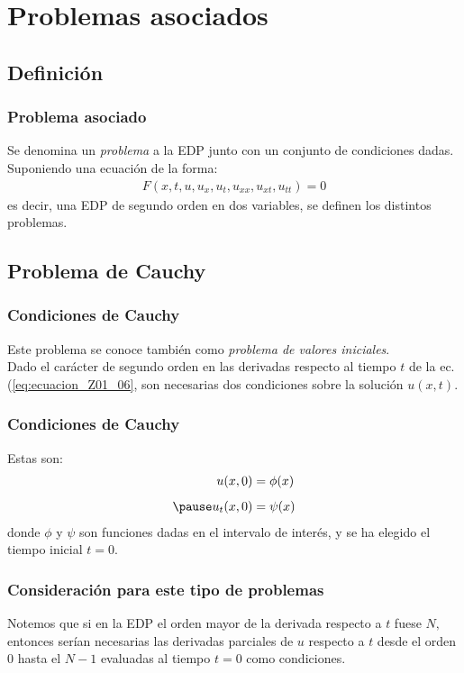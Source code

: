 \documentclass[12pt]{beamer}
\begin{document}

\section{Problemas asociados}
\subsection{Definición}

\begin{frame}
\frametitle{Problema asociado}
Se denomina un \emph{problema} a la EDP junto con un conjunto de condiciones dadas.
\\
\bigskip
\pause
Suponiendo una ecuación de la forma:
\begin{align}
F(x, t, u, u_{x}, u_{t}, u_{xx}, u_{xt}, u_{tt}) = 0
\label{eq:ecuacion_Z01_06}
\end{align}
es decir, una EDP de segundo orden en dos variables, se definen los distintos problemas.
\end{frame}

\subsection{Problema de Cauchy}

\begin{frame}
\frametitle{Condiciones de Cauchy}
Este problema se conoce también como \emph{problema de valores iniciales}.
\\
\bigskip
\pause
Dado el carácter de segundo orden en las derivadas respecto al tiempo $t$ de la ec. (\ref{eq:ecuacion_Z01_06}, son necesarias dos condiciones sobre la solución $u(x, t)$.
\end{frame}
\begin{frame}
\frametitle{Condiciones de Cauchy}
Estas son:
\pause
\begin{eqnarray}
u(x, 0) &= \phi (x) \label{eq:ecuacion_Z01_07} \\[0.5em] \pause
u_{t}(x, 0) &= \psi (x) \label{eq:ecuacion_Z01_08}
\end{eqnarray}
donde $\phi$ y $\psi$ son funciones dadas en el intervalo de interés, y se ha elegido el tiempo inicial $t = 0$.
\end{frame}
\begin{frame}
\frametitle{Consideración para este tipo de problemas}
Notemos que si en la EDP el orden mayor de la derivada respecto a $t$ fuese $N,$ entonces serían necesarias las derivadas parciales de $u$ respecto a $t$ desde el orden $0$ hasta el $N - 1$ evaluadas al tiempo $t = 0$ como condiciones.
\end{frame}
\end{document}
